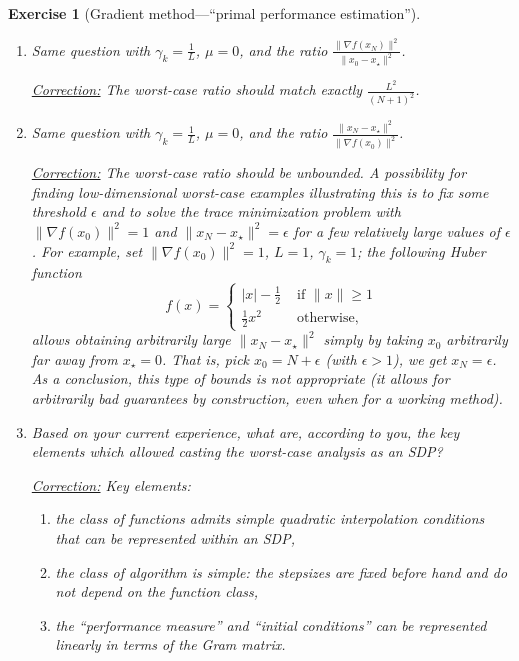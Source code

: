 \documentclass[11pt,a4paper]{article}
\newcommand{\correction}[1]{{{\color{blue}\underline{Correction:} #1}}}
\newcommand{\correction}[1]{}
\newtheorem{exercise}{Exercise}
\begin{document}
\begin{exercise}[Gradient method---``primal performance estimation'']
\begin{enumerate}
	\correction{The worst-case ratio should match exactly $\frac{L}{4N+2}$.}
	
	
	\item Same question with $\gamma_k=\tfrac{1}{L}$, $\mu=0$, and the ratio $\frac{\|\nabla f(x_N)\|^2}{\|x_0-x_\star\|^2}$.
	
	\correction{The worst-case ratio should match exactly $\frac{L^2}{(N+1)^2}$.}
	
	\item Same question with $\gamma_k=\tfrac{1}{L}$, $\mu=0$, and the ratio $\frac{\|x_N-x_\star\|^2}{\|\nabla f(x_0)\|^2}$.
	
	\correction{The worst-case ratio should be unbounded. A possibility for finding low-dimensional worst-case examples illustrating this is to fix some threshold $\epsilon$ and to solve the trace minimization problem with $\|\nabla f(x_0)\|^2=1$ and $\|x_N-x_\star\|^2=\epsilon$ for a few relatively large values of $\epsilon$. For example, set $\|\nabla f(x_0)\|^2=1$, $L=1$, $\gamma_k=1$; the following Huber function
\begin{equation}
f(x)=\left\{\begin{array}{ll}
|x| - \tfrac{1}{2} & \text{ if } \|x\|\geqslant 1\\
\tfrac{1}{2}x^2 & \text{ otherwise, }
\end{array}\right.
\end{equation}	
allows obtaining arbitrarily large $\|x_N-x_\star\|^2$ simply by taking $x_0$ arbitrarily far away from $x_\star=0$. That is, pick $x_0=N+\epsilon$ (with $\epsilon>1$), we get $x_N=\epsilon$. As a conclusion, this type of bounds is not appropriate (it allows for arbitrarily bad guarantees by construction, even when for a working method).}
	
	\item Based on your current experience, what are, according to you, the key elements which allowed casting the worst-case analysis as an SDP?
	
	\correction{ Key elements:
	\begin{enumerate}
	\item the class of functions admits simple quadratic interpolation conditions that can be represented within an SDP,
	\item the class of algorithm is simple: the stepsizes are fixed before hand and do not depend on the function class,
	\item the ``performance measure'' and ``initial conditions'' can be represented linearly in terms of the Gram matrix.
	\end{enumerate}
	
	}
	\end{enumerate}
	\end{exercise}
\end{document}

